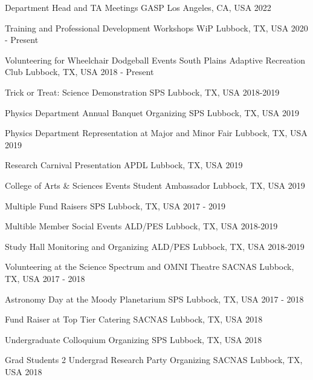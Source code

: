 
\begin{cvhonors}

    \cvhonor
    {Department Head and TA Meetings}
    {GASP}
    {Los Angeles, CA, USA}
    {2022}

    \cvhonor
    {Training and Professional Development Workshops}
    {WiP}
    {Lubbock, TX, USA}
    {2020 - Present}

    \cvhonor
    {Volunteering for Wheelchair Dodgeball Events}
    {South Plains Adaptive Recreation Club}
    {Lubbock, TX, USA}
    {2018 - Present}

    \cvhonor
    {Trick or Treat: Science Demonstration}
    {SPS}
    {Lubbock, TX, USA}
    {2018-2019}

    \cvhonor
    {Physics Department Annual Banquet Organizing}
    {SPS}
    {Lubbock, TX, USA}
    {2019}

    \cvhonor
    {Physics Department Representation at Major and Minor Fair}
    {}
    {Lubbock, TX, USA}
    {2019}

    \cvhonor
    {Research Carnival Presentation}
    {APDL}
    {Lubbock, TX, USA}
    {2019}

    \cvhonor
    {College of Arts \& Sciences Events}
    {Student Ambassador}
    {Lubbock, TX, USA}
    {2019}


    \cvhonor
    {Multiple Fund Raisers}
    {SPS}
    {Lubbock, TX, USA}
    {2017 - 2019}

    \cvhonor
    {Multible Member Social Events}
    {ALD/PES}
    {Lubbock, TX, USA}
    {2018-2019}

    \cvhonor
    {Study Hall Monitoring and Organizing}
    {ALD/PES}
    {Lubbock, TX, USA}
    {2018-2019}

    \cvhonor
    {Volunteering at the Science Spectrum and OMNI Theatre}
    {SACNAS}
    {Lubbock, TX, USA}
    {2017 - 2018}

    \cvhonor
    {Astronomy Day at the Moody Planetarium}
    {SPS}
    {Lubbock, TX, USA}
    {2017 - 2018}

    \cvhonor
    {Fund Raiser at Top Tier Catering}
    {SACNAS}
    {Lubbock, TX, USA}
    {2018}

    \cvhonor
    {Undergraduate Colloquium Organizing}
    {SPS}
    {Lubbock, TX, USA}
    {2018}


    \cvhonor
    {Grad Students 2 Undergrad Research Party Organizing}
    {SACNAS}
    {Lubbock, TX, USA}
    {2018}


\end{cvhonors}
